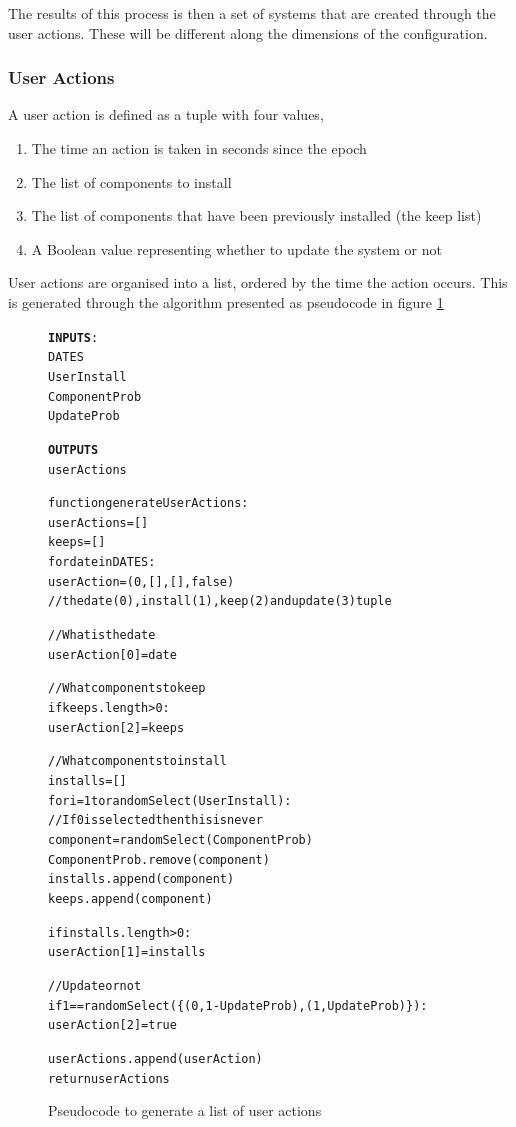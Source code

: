 The results of this process is then a set of systems that are created through the user actions.
These will be different along the dimensions of the configuration.

\subsubsection{User Actions}
A user action is defined as a tuple with four values,
\begin{enumerate}
  \item The time an action is taken in seconds since the epoch
  \item The list of components to install
  \item The list of components that have been previously installed (the keep list)
  \item A Boolean value representing whether to update the system or not
\end{enumerate}

User actions are organised into a list, ordered by the time the action occurs.
This is generated through the algorithm presented as pseudocode in figure \ref{generateuser}

\begin{figure}[htp]
\begin{center}
\begin{alltt}
\textbf{INPUTS}:
DATES
UserInstall
ComponentProb
UpdateProb

\textbf{OUTPUTS}
userActions

function generateUserActions: 
    userActions = []
    keeps = []
    for date in DATES:
        userAction = (0, [], [], false) 
        //the date(0), install(1), keep(2) and update(3) tuple
        
        //What is the date
        userAction[0] = date
        
        //What components to keep
        if keeps.length > 0:
            userAction[2] = keeps 
            
        //What components to install
        installs = []
        for i = 1 to randomSelect(UserInstall):
            //If 0 is selected then this is never
            component = randomSelect(ComponentProb)
            ComponentProb.remove(component)
            installs.append(component)
            keeps.append(component)
            
        if installs.length > 0:
            userAction[1] = installs 
        
        //Update or not
        if 1 == randomSelect(\{(0,1-UpdateProb),(1,UpdateProb)\}):
            userAction[2] = true
            
        userActions.append(userAction)        
    return userActions
\end{alltt}
\caption[generateUser Pseudocode]{Pseudocode to generate a list of user actions}
\label{generateuser}
\end{center}
\end{figure}



